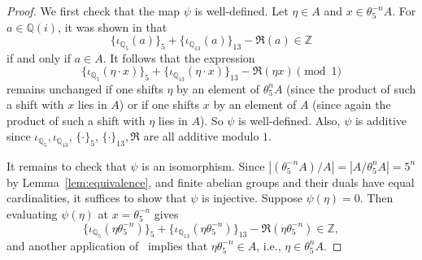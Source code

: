 \documentclass[11pt]{amsart}
\theoremstyle{definition}
\newcommand{\Q}{{\mathbb Q}}
\newcommand{\Z}{{\mathbb Z}}
\begin{document}
\begin{proof}
We first check that the map $\psi$ is well-defined.  Let $\eta \in A$ and $x \in \theta_5^{-n}A$.  For $a \in \Q(i)$, it was shown in \cite[Proposition 6.2]{Man13} that $$\{\iota_{\mathbb{Q}_5}(a)\}_5 + \{\iota_{\mathbb{Q}_{13}}(a)\}_{13} - \Re(a) \in \mathbb{Z}$$ if and only if $a \in A$.  It follows that the expression
$$\{\iota_{\mathbb{Q}_5}(\eta \cdot x)\}_5 + \{\iota_{\mathbb{Q}_{13}}(\eta \cdot x)\}_{13} - \Re(\eta x) \pmod{1}$$
remains unchanged if one shifts $\eta$ by an element of $\theta_5^n A$ (since the product of such a shift with $x$ lies in $A$) or if one shifts $x$ by an element of $A$ (since again the product of such a shift with $\eta$ lies in $A$).  So $\psi$ is well-defined.  Also, $\psi$ is additive since $\iota_{\mathbb{Q}_5}, \iota_{\mathbb{Q}_{13}}$, $\{\cdot\}_5$, $\{\cdot\}_{13}, \Re$ are all additive modulo $1$.

It remains to check that $\psi$ is an isomorphism.  Since $|(\theta_5^{-n}A)/A|=|A/\theta_5^nA|=5^n$ by Lemma~\ref{lem:equivalence}, and finite abelian groups and their duals have equal cardinalities, it suffices to show that $\psi$ is injective.  Suppose $\psi(\eta)=0$.  Then evaluating $\psi(\eta)$ at $x=\theta_5^{-n}$ gives
$$\{\iota_{\mathbb{Q}_5}(\eta \theta_5^{-n})\}_5 + \{\iota_{\mathbb{Q}_{13}}(\eta \theta_5^{-n})\}_{13} - \Re(\eta \theta_5^{-n}) \in \Z,$$
and another application of~\cite[Proposition 6.2]{Man13} implies that $\eta\theta_5^{-n} \in A$, i.e., $\eta \in \theta_5^n A$.
\end{proof}
\end{document}
